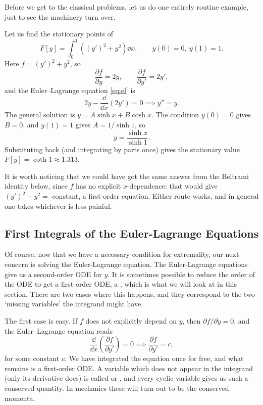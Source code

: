 Before we get to the classical problems, let us do one entirely routine example, just to see the machinery turn over.

\begin{example}
	Let us find the stationary points of
	$$
	F[y] = \int_0^1\left((y')^2 + y^2\right)\dd x, \qquad y(0) = 0, \ y(1) = 1.
	$$
	Here $f = (y')^2 + y^2$, so
	$$
	\frac{\partial f}{\partial y} = 2y, \qquad \frac{\partial f}{\partial y'} = 2y',
	$$
	and the Euler--Lagrange equation \eqref{eq:el} is
	$$
	2y - \frac{\dd}{\dd x}(2y') = 0 \implies y'' = y.
	$$
	The general solution is $y = A\sinh x + B\cosh x$. The condition $y(0) = 0$ gives $B = 0$, and $y(1) = 1$ gives $A = 1/\sinh 1$, so
	$$
	y = \frac{\sinh x}{\sinh 1}.
	$$
	Substituting back (and integrating by parts once) gives the stationary value $F[y] = \coth 1 \approx 1.313$.

	It is worth noticing that we could have got the same answer from the Beltrami identity below, since $f$ has no explicit $x$-dependence: that would give $(y')^2 - y^2 = $ constant, a first-order equation. Either route works, and in general one takes whichever is less painful.
\end{example}

\subsection{First Integrals of the Euler-Lagrange Equations}

Of course, now that we have a necessary condition for extremality, our next concern is solving the Euler-Lagrange equation.
The Euler-Lagrange equations give us a second-order ODE for $y$.
It is sometimes possible to reduce the order of the ODE to get a first-order ODE, a , which is what we will look at in this section.
There are two cases where this happens, and they correspond to the two `missing variables' the integrand might have.

The first case is easy. If $f$ does not explicitly depend on $y$, then $\partial f/\partial y = 0$, and the Euler--Lagrange equation reads
$$
 \frac{\dd}{\dd x} \left(\frac{\partial f}{\partial y'}\right) = 0 \implies \frac{\partial f}{\partial y'} = c,
$$
for some constant $c$. We have integrated the equation once for free, and what remains is a first-order ODE. A variable which does not appear in the integrand (only its derivative does) is called  or , and every cyclic variable gives us such a conserved quantity. In mechanics these will turn out to be the conserved momenta.

